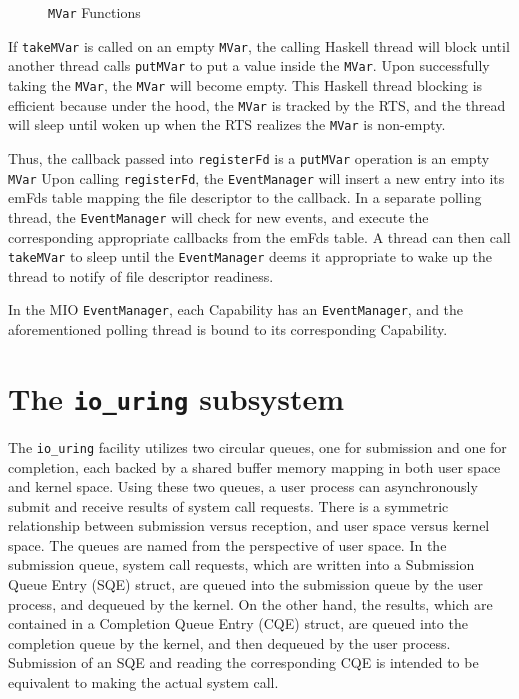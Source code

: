 \begin{figure}[H]
  \centering
  
  \caption[\texttt{MVar} Functions]{
    \texttt{MVar} Functions
  }
  \label{fig:MVar}
\end{figure}


If \texttt{takeMVar} is called on an empty \texttt{MVar}, the calling Haskell thread will block until another thread calls \texttt{putMVar}
to put a value inside the \texttt{MVar}. Upon successfully taking the \texttt{MVar},
the \texttt{MVar} will become empty.
This Haskell thread blocking is efficient because under the hood,
the \texttt{MVar} is tracked by the RTS, and the thread will sleep until woken up when the RTS realizes the \texttt{MVar} is non-empty.

Thus, the callback passed into \texttt{registerFd} is a \texttt{putMVar} operation is an empty \texttt{MVar}
 Upon calling \texttt{registerFd}, the \texttt{EventManager} will insert a new entry into its emFds
table mapping the file descriptor to the callback. In a separate polling thread,
the \texttt{EventManager} will check for new events, and execute the corresponding appropriate
callbacks from the emFds table. A thread can then call \texttt{takeMVar} to sleep until the \texttt{EventManager}
deems it appropriate to wake up the thread to notify of file descriptor readiness.

In the MIO \texttt{EventManager}, each Capability has an \texttt{EventManager}, and the aforementioned polling
thread is bound to its corresponding Capability.

\clearpage
\section{The \texttt{io\_uring} subsystem}

The \texttt{io\_uring} facility utilizes two circular queues, one for submission and one for completion,
each backed by a shared buffer memory mapping in both user space and kernel space.
Using these two queues, a user process can asynchronously submit and receive results
of system call requests. There is a symmetric relationship between submission versus
reception, and user space versus kernel space. The queues are named from the perspective
of user space. In the submission queue, system call requests, which are written into a
Submission Queue Entry (SQE) struct, are queued into the submission queue by the user process,
and dequeued by the kernel. On the other hand, the results, which are contained in a
Completion Queue Entry (CQE) struct, are queued into the completion queue by the kernel,
and then dequeued by the user process. Submission of an SQE and reading the corresponding
CQE is intended to be equivalent to making the actual system call.

